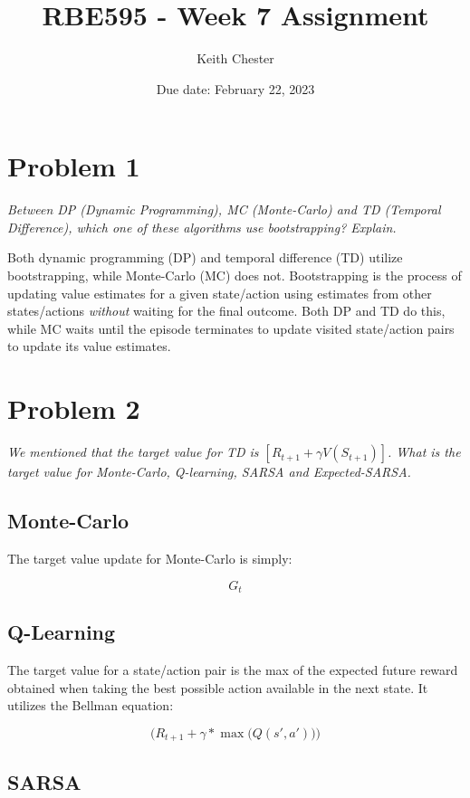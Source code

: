 \documentclass{article}
\title{RBE595 - Week 7 Assignment}
\author{Keith Chester}
\date{Due date: February 22, 2023}
\begin{document}
\maketitle

\section*{Problem 1}
\textit{Between DP (Dynamic Programming), MC (Monte-Carlo) and TD (Temporal Difference), which
    one of these algorithms use bootstrapping? Explain. }

Both dynamic programming (DP) and temporal difference (TD) utilize bootstrapping, while Monte-Carlo (MC) does not. Bootstrapping is the process of updating value estimates for a given state/action using estimates from other states/actions \textit{without} waiting for the final outcome. Both DP and TD do this, while MC waits until the episode terminates to update visited state/action pairs to update its value estimates.

\section*{Problem 2}
\textit{We mentioned that the target value for TD is $[R_{t+1} + \gamma V(S_{t+1})]$. What is the target value for Monte-Carlo, Q-learning, SARSA and Expected-SARSA.}

\subsection*{Monte-Carlo}

The target value update for Monte-Carlo is simply:

\begin{equation}
    G_t
\end{equation}

\subsection*{Q-Learning}

The target value for a state/action pair is the max of the expected future reward obtained when taking the best possible action available in the next state. It utilizes the Bellman equation:

\begin{equation}
    \biggl( R_{t+1} + \gamma * \max\bigl(Q(s',a')\bigr)\biggr)
\end{equation}

\subsection*{SARSA}
\end{document}
